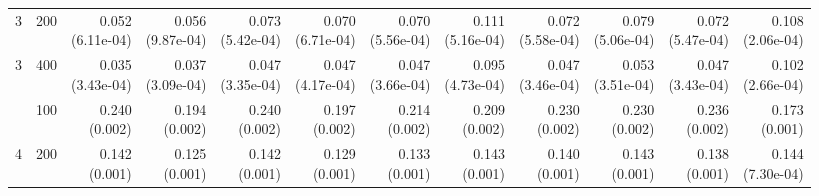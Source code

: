 \begin{table}[p]
{\begin{tabular}{llrrrrrrrrrr}
3 & 200 & \shortstack{0.052\\(6.11e-04)} & \shortstack{0.056\\(9.87e-04)} & \shortstack{0.073\\(5.42e-04)} & \shortstack{0.070\\(6.71e-04)} & \shortstack{0.070\\(5.56e-04)} & \shortstack{0.111\\(5.16e-04)} & \shortstack{0.072\\(5.58e-04)} & \shortstack{0.079\\(5.06e-04)} & \shortstack{0.072\\(5.47e-04)} & \shortstack{0.108\\(2.06e-04)} \\
3 & 400 & \shortstack{0.035\\(3.43e-04)} & \shortstack{0.037\\(3.09e-04)} & \shortstack{0.047\\(3.35e-04)} & \shortstack{0.047\\(4.17e-04)} & \shortstack{0.047\\(3.66e-04)} & \shortstack{0.095\\(4.73e-04)} & \shortstack{0.047\\(3.46e-04)} & \shortstack{0.053\\(3.51e-04)} & \shortstack{0.047\\(3.43e-04)} & \shortstack{0.102\\(2.66e-04)} \\
\addlinespace
4 & 100 & \shortstack{0.240\\(0.002)} & \shortstack{0.194\\(0.002)} & \shortstack{0.240\\(0.002)} & \shortstack{0.197\\(0.002)} & \shortstack{0.214\\(0.002)} & \shortstack{0.209\\(0.002)} & \shortstack{0.230\\(0.002)} & \shortstack{0.230\\(0.002)} & \shortstack{0.236\\(0.002)} & \shortstack{0.173\\(0.001)} \\
4 & 200 & \shortstack{0.142\\(0.001)} & \shortstack{0.125\\(0.001)} & \shortstack{0.142\\(0.001)} & \shortstack{0.129\\(0.001)} & \shortstack{0.133\\(0.001)} & \shortstack{0.143\\(0.001)} & \shortstack{0.140\\(0.001)} & \shortstack{0.143\\(0.001)} & \shortstack{0.138\\(0.001)} & \shortstack{0.144\\(7.30e-04)} \\

\end{tabular}}
\end{table}

